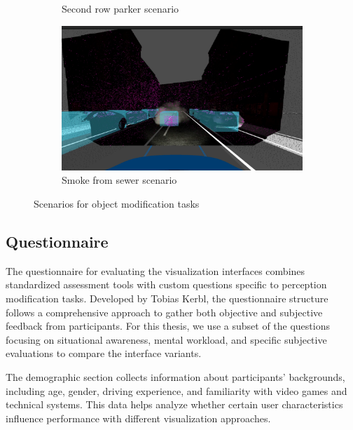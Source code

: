 \begin{figure}
\begin{subfigure}[b]{0.45\textwidth}
        \caption{Second row parker scenario}
        \label{fig:scenario_srp}
    \end{subfigure}
    \hfill
    \begin{subfigure}[b]{0.45\textwidth}
        \centering
        \includegraphics[width=\textwidth]{figures/scenario_smoke.png}
        \caption{Smoke from sewer scenario}
        \label{fig:scenario_smoke}
    \end{subfigure}
    \caption{Scenarios for object modification tasks}
    \label{fig:full}
\end{figure}


\subsection{Questionnaire}
The questionnaire for evaluating the visualization interfaces combines standardized assessment tools with custom questions specific to perception modification tasks. Developed by Tobias Kerbl, the questionnaire structure follows a comprehensive approach to gather both objective and subjective feedback from participants. For this thesis, we use a subset of the questions focusing on situational awareness, mental workload, and specific subjective evaluations to compare the interface variants.

The demographic section collects information about participants' backgrounds, including age, gender, driving experience, and familiarity with video games and technical systems. This data helps analyze whether certain user characteristics influence performance with different visualization approaches.

